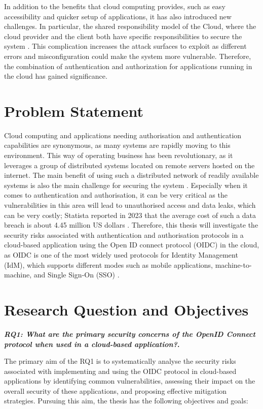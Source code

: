 In addition to the benefits that cloud computing provides, such as easy accessibility and quicker setup of applications, it has also introduced new challenges. In particular, the shared responsibility model of the Cloud, where the cloud provider and the client both have specific responsibilities to secure the system \citep{shared_principal}. This complication increases the attack surfaces to exploit as different errors and misconfiguration could make the system more vulnerable. Therefore, the combination of authentication and authorization for applications running in the cloud has gained significance. 


\section{Problem Statement}
Cloud computing and applications needing authorisation and authentication capabilities are synonymous, as many systems are rapidly moving to this environment. This way of operating business has been revolutionary, as it leverages a group of distributed systems located on remote servers hosted on the internet. The main benefit of using such a distributed network of readily available systems is also the main challenge for securing the system \citep{Alouffi2021-yh}. Especially when it comes to authentication and authorisation, it can be very critical as the vulnerabilities in this area will lead to unauthorised access and data leaks, which can be very costly; Statista reported in 2023 that the average cost of such a data breach is about 4.45 million US dollars \citep{statista_data_breach}. Therefore, this thesis will investigate the security risks associated with authentication and authorisation protocols in a cloud-based application using the Open ID connect protocol (OIDC) in the cloud, as OIDC is one of the most widely used protocols for Identity Management (IdM), which supports different modes such as mobile applications, machine-to-machine, and Single Sign-On (SSO) \citep{oidc_popular}.

\section{Research Question and Objectives}\label{sec:objectives}
\textbf{\textit{RQ1: What are the primary security concerns of the OpenID Connect protocol when used in a cloud-based application?}.}

The primary aim of the RQ1 is to systematically analyse the security risks associated with implementing and using the OIDC protocol in cloud-based applications by identifying common vulnerabilities, assessing their impact on the overall security of these applications, and proposing effective mitigation strategies. Pursuing this aim, the thesis has the following objectives and goals:

